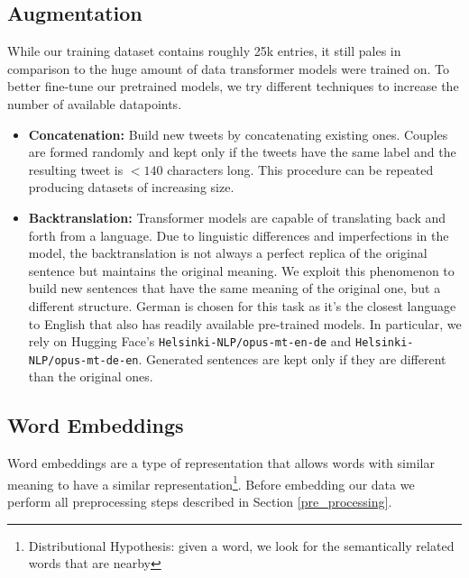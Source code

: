 \documentclass{article}
\begin{document}
    \subsection{Augmentation}
    While our training dataset contains roughly 25k entries, it still pales in comparison to the huge amount of data transformer models were trained on. To better fine-tune our pretrained models, we try different techniques to increase the number of available datapoints. 
	\begin{itemize}
		\item \textbf{Concatenation:} Build new tweets by concatenating existing ones. Couples are formed randomly and kept only if the tweets have the same label and  the resulting tweet is $< 140$ characters long. This procedure can be repeated producing datasets of increasing size.
		\item \textbf{Backtranslation:} Transformer models are capable of translating back and forth from a language. Due to linguistic differences and imperfections in the model, the backtranslation is not always a perfect replica of the original sentence but maintains the original meaning. We exploit this phenomenon to build new sentences that have the same meaning of the original one, but a different structure. German is chosen for this task as it's the closest language to English that also has readily available pre-trained models. In particular, we rely on Hugging Face's \texttt{Helsinki-NLP/opus-mt-en-de} and \texttt{Helsinki-NLP/opus-mt-de-en}. Generated sentences are kept only if they are different than the original ones.
	\end{itemize}

    \subsection{Word Embeddings}
    Word embeddings are a type of representation that allows words with similar meaning to have a similar representation\footnote{Distributional Hypothesis: given a word, we look for the semantically related words that are nearby}. Before embedding our data we perform all preprocessing steps described in Section \ref{pre_processing}.
    
\end{document}

